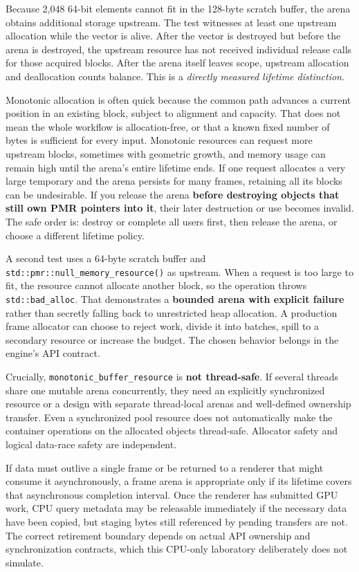 Because 2,048 64-bit elements cannot fit in the 128-byte scratch buffer, the arena obtains additional storage upstream. The test witnesses at least one upstream allocation while the vector is alive. After the vector is destroyed but before the arena is destroyed, the upstream resource has not received individual release calls for those acquired blocks. After the arena itself leaves scope, upstream allocation and deallocation counts balance. This is a \emph{directly measured lifetime distinction}.

Monotonic allocation is often quick because the common path advances a current position in an existing block, subject to alignment and capacity. That does not mean the whole workflow is allocation-free, or that a known fixed number of bytes is sufficient for every input. Monotonic resources can request more upstream blocks, sometimes with geometric growth, and memory usage can remain high until the arena's entire lifetime ends. If one request allocates a very large temporary and the arena persists for many frames, retaining all its blocks can be undesirable. If you release the arena \textbf{before destroying objects that still own PMR pointers into it}, their later destruction or use becomes invalid. The safe order is: destroy or complete all users first, then release the arena, or choose a different lifetime policy.

A second test uses a 64-byte scratch buffer and \texttt{std::pmr::null\_memory\_resource()} as upstream. When a request is too large to fit, the resource cannot allocate another block, so the operation throws \texttt{std::bad\_alloc}. That demonstrates a \textbf{bounded arena with explicit failure} rather than secretly falling back to unrestricted heap allocation. A production frame allocator can choose to reject work, divide it into batches, spill to a secondary resource or increase the budget. The chosen behavior belongs in the engine's API contract.

Crucially, \texttt{monotonic\_buffer\_resource} is \textbf{not thread-safe}. If several threads share one mutable arena concurrently, they need an explicitly synchronized resource or a design with separate thread-local arenas and well-defined ownership transfer. Even a synchronized pool resource does not automatically make the container operations on the allocated objects thread-safe. Allocator safety and logical data-race safety are independent.

If data must outlive a single frame or be returned to a renderer that might consume it asynchronously, a frame arena is appropriate only if its lifetime covers that asynchronous completion interval. Once the renderer has submitted GPU work, CPU query metadata may be releasable immediately if the necessary data have been copied, but staging bytes still referenced by pending transfers are not. The correct retirement boundary depends on actual API ownership and synchronization contracts, which this CPU-only laboratory deliberately does not simulate.

